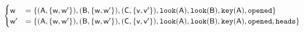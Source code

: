$\begin{cases}
	\poss{w}&= \bra{
		(\agent{a},\bra{\poss{w}, \poss{w^\prime}}),
		(\agent{b},\bra{\poss{w}, \poss{w^\prime}}),
 		(\agent{c},\bra{\poss{v}, \poss{v^\prime}}),
 		\looking{a},
 		\looking{b},
 		\haskey{a},
		\opened}\\
	\poss{w^\prime} &=\bra{
		(\agent{a},\bra{\poss{w}, \poss{w^\prime}}),
		(\agent{b},\bra{\poss{w}, \poss{w^\prime}}),
		(\agent{c},\bra{\poss{v}, \poss{v^\prime}}),
		\looking{a},
		\looking{b},
		\haskey{a},
		\opened,
		\head}
\end{cases}$

